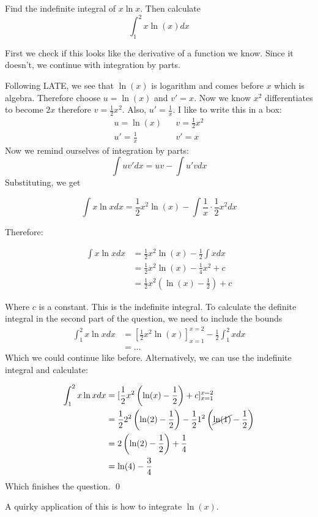 \begin{example}
    Find the indefinite integral of $x \ln x$. Then calculate 
    \[ \int_{1}^{2} x\ln(x) dx\]
\end{example}
\begin{solution}
    First we check if this looks like the derivative of a function we know. Since it doesn't, we continue with integration by parts.

    Following LATE, we see that $\ln(x)$ is logarithm and comes before $x$ which is algebra. Therefore choose $u=\ln(x)$ and $v' = x$.
    Now we know $x^2$ differentiates to become $2x$ therefore $v = \frac{1}{2} x^2$. Also, $u' = \frac{1}{x}$. I like to write this in a box:
    \begin{align*}
        u = \ln (x) & & v= \frac{1}{2} x^2 \\
        u' = \frac{1}{x} & & v' = x
    \end{align*}
    Now we remind ourselves of integration by parts:
    \[ \int u v' dx = uv - \int u' v dx \]
    Substituting, we get 

    \[ \int x \ln x dx = \frac{1}{2} x^2 \ln (x) - \int \frac{1}{x} \cdot \frac{1}{2} x^2 dx \]

    Therefore:

    \begin{align*}
        \int x \ln x dx &= \frac{1}{2} x^2 \ln (x) - \frac{1}{2} \int x dx \\
            &= \frac{1}{2} x^2 \ln (x) - \frac{1}{4} x^2 + c \\
            &= \frac{1}{2} x^2 (\ln(x) - \frac{1}{2}) + c
    \end{align*}

    Where $c$ is a constant. This is the indefinite integral. To calculate the definite integral in the second part of the question, we need to include the bounds
    \begin{align*}
        \int_1^2 x \ln x dx &= [\frac{1}{2} x^2 \ln (x)]_{x=1}^{x=2} - \frac{1}{2} \int_1^2 x dx \\
            &= \dots
    \end{align*}
    Which we could continue like before. Alternatively, we can use the indefinite integral and calculate:

    \begin{align*}
        \int_1^2 x \ln x dx &=  [\frac{1}{2} x^2 \left(\ln(x) - \frac{1}{2}\right) + c]_{x=1}^{x=2} \\
         &=  \frac{1}{2} 2^2 \left(\ln(2) - \frac{1}{2}\right)  - \frac{1}{2} 1^2 \left(\cancel{\ln(1)} - \frac{1}{2}\right) \\
         &=  2 \left( \ln(2) - \frac{1}{2} \right) + \frac{1}{4} \\
         &= \ln(4) - \frac{3}{4}
    \end{align*}
    Which finishes the question.
    \qed
\end{solution}
A quirky application of this is how to integrate $\ln(x)$.

